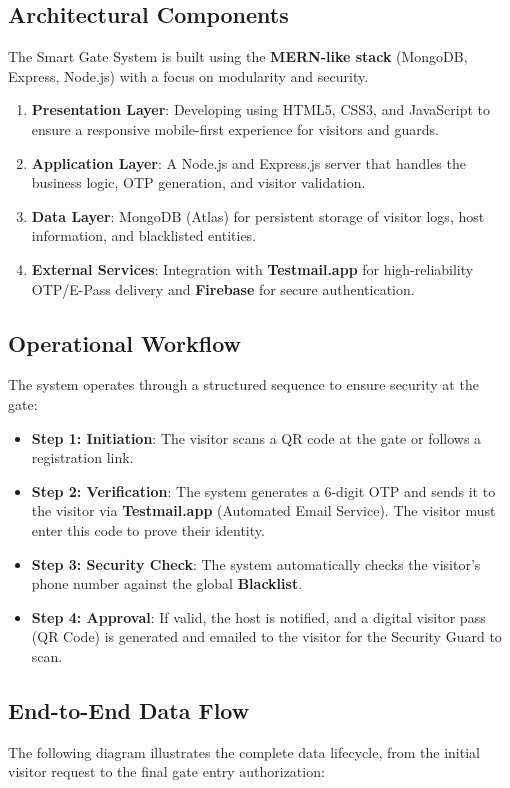 \documentclass[12pt,a4paper]{article}
\begin{document}
\subsection{Architectural Components}
The Smart Gate System is built using the \textbf{MERN-like stack} (MongoDB, Express, Node.js) with a focus on modularity and security.
\begin{enumerate}
    \item \textbf{Presentation Layer}: Developing using HTML5, CSS3, and JavaScript to ensure a responsive mobile-first experience for visitors and guards.
    \item \textbf{Application Layer}: A Node.js and Express.js server that handles the business logic, OTP generation, and visitor validation.
    \item \textbf{Data Layer}: MongoDB (Atlas) for persistent storage of visitor logs, host information, and blacklisted entities.
    \item \textbf{External Services}: Integration with \textbf{Testmail.app} for high-reliability OTP/E-Pass delivery and \textbf{Firebase} for secure authentication.
\end{enumerate}

\subsection{Operational Workflow}
The system operates through a structured sequence to ensure security at the gate:
\begin{itemize}
    \item \textbf{Step 1: Initiation}: The visitor scans a QR code at the gate or follows a registration link.
    \item \textbf{Step 2: Verification}: The system generates a 6-digit OTP and sends it to the visitor via \textbf{Testmail.app} (Automated Email Service). The visitor must enter this code to prove their identity.
    \item \textbf{Step 3: Security Check}: The system automatically checks the visitor's phone number against the global \textbf{Blacklist}.
    \item \textbf{Step 4: Approval}: If valid, the host is notified, and a digital visitor pass (QR Code) is generated and emailed to the visitor for the Security Guard to scan.
\end{itemize}

\subsection{End-to-End Data Flow}
The following diagram illustrates the complete data lifecycle, from the initial visitor request to the final gate entry authorization:
\end{document}
